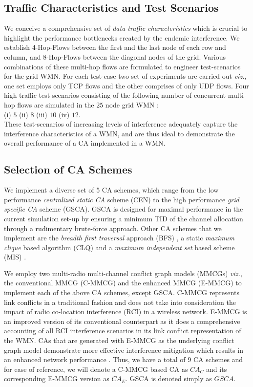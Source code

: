 \documentclass[conference]{IEEEtran}
\begin{document}
\subsection{Traffic Characteristics and Test Scenarios}
We conceive a comprehensive set of \textit{data traffic characteristics} which is crucial to highlight the performance bottlenecks created by the endemic interference. We establish \mbox{4-Hop-Flows} between the first and the last node of each row and column, and \mbox{8-Hop-Flows} between the diagonal nodes of the grid. Various combinations of these multi-hop flows are formulated to engineer test-scenarios for the grid WMN. For each test-case two set of experiments are carried out \emph{viz.}, one set employs only TCP flows and the other comprises of only UDP flows. Four high traffic test-scenarios consisting of the following number of concurrent multi-hop flows are simulated in the $25$ node grid WMN :\\ 
(i) $5$ \quad \quad  (ii) $8$ \quad \quad (iii) $10$  \quad  \quad (iv) $12$. \\
These test-scenarios of increasing levels of interference adequately capture the interference characteristics of a WMN, and are thus ideal to demonstrate the overall performance of a CA implemented in a WMN. 
 
\subsection{Selection of CA Schemes} 
We implement a diverse set of 5 CA schemes, which range from the low performance \textit{centralized static CA} scheme (CEN) \cite{23Cheng} to the high performance \textit{grid specific CA} scheme (GSCA). GSCA is designed for maximal performance in the current simulation set-up by ensuring a minimum TID of the channel allocation through a rudimentary brute-force approach. Other CA schemes that we implement are the \textit{breadth first traversal} approach (BFS) \cite{22Ramachandran}, a static \textit{maximum clique} based algorithm (CLQ) \cite{17Xutao} and a \textit{maximum independent set} based scheme (MIS) \cite{24Aizaz}. 

We employ two multi-radio multi-channel conflict graph models (MMCGs) \emph{viz.}, the conventional MMCG (C-MMCG) and the enhanced MMCG (E-MMCG) \cite{Manas} to implement each of the above CA schemes, except GSCA. C-MMCG represents link conflicts in a traditional fashion and does not take into consideration the impact of radio co-location interference (RCI) in a wireless network. E-MMCG is an improved version of its conventional counterpart as it does a comprehensive accounting of all RCI interference scenarios in its link conflict representation of the WMN. CAs that are generated with E-MMCG as the underlying conflict graph model demonstrate more effective interference mitigation which results in an enhanced network performance \cite{Manas}. Thus, we have a total of 9 CA schemes and for ease of reference, we will denote a C-MMCG based CA as $CA_C$ and its corresponding E-MMCG version as $CA_E$. GSCA is denoted simply as $GSCA$.
\end{document}
